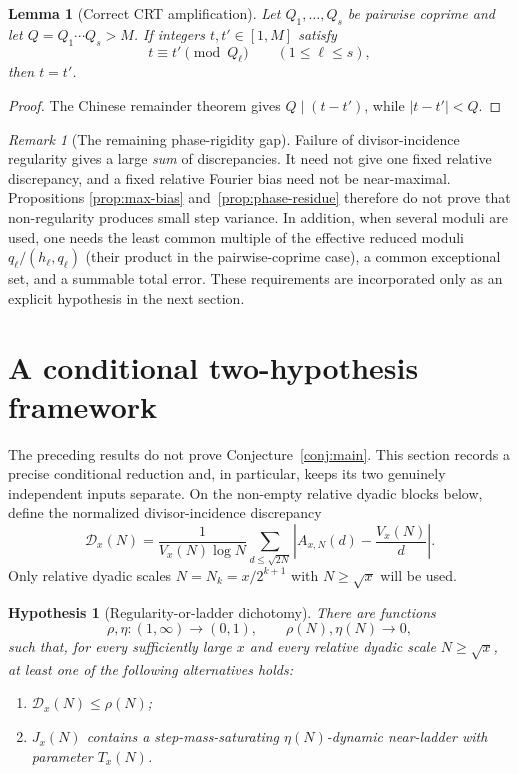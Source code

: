 \documentclass[11pt]{article}
\newtheorem{lemma}[theorem]{Lemma}
\newtheorem{hypothesis}[theorem]{Hypothesis}
\theoremstyle{definition}
\theoremstyle{remark}
\newtheorem{remark}[theorem]{Remark}
\begin{document}
\begin{lemma}[Correct CRT amplification]\label{lem:crt}
Let $Q_1,\ldots,Q_s$ be pairwise coprime and let
$Q=Q_1\cdots Q_s>M$.  If integers $t,t'\in[1,M]$ satisfy
\[
 t\equiv t'\pmod{Q_\ell}
 \qquad(1\leq\ell\leq s),
\]
then $t=t'$.
\end{lemma}

\begin{proof}
The Chinese remainder theorem gives $Q\mid(t-t')$, while
$|t-t'|<Q$.
\end{proof}

\begin{remark}[The remaining phase-rigidity gap]
Failure of divisor-incidence regularity gives a large \emph{sum} of
discrepancies.  It need not give one fixed relative discrepancy, and a
fixed relative Fourier bias need not be near-maximal.  Propositions
\ref{prop:max-bias} and~\ref{prop:phase-residue} therefore do not prove
that non-regularity produces small step variance.  In addition, when
several moduli are used, one needs the least common multiple of the
effective reduced moduli $q_\ell/(h_\ell,q_\ell)$ (their product in the
pairwise-coprime case), a common exceptional set, and a
summable total error.  These requirements are incorporated only as an
explicit hypothesis in the next section.
\end{remark}

\section{A conditional two-hypothesis framework}\label{sec:conditional}

The preceding results do not prove Conjecture~\ref{conj:main}.  This
section records a precise conditional reduction and, in particular,
keeps its two genuinely independent inputs separate.  On the non-empty
relative dyadic blocks below, define the
normalized divisor-incidence discrepancy
\[
 \mathcal D_x(N)=
 \frac{1}{V_x(N)\log N}
 \sum_{d\leq\sqrt{2N}}
 \left|A_{x,N}(d)-\frac{V_x(N)}d\right|.
\]
Only relative dyadic scales $N=N_k=x/2^{k+1}$ with
$N\geq\sqrt x$ will be used.

\begin{hypothesis}[Regularity-or-ladder dichotomy]\label{hyp:dichotomy}
There are functions
\[
 \rho,\eta:(1,\infty)\longrightarrow(0,1),
 \qquad \rho(N),\eta(N)\longrightarrow0,
\]
such that, for every sufficiently large $x$ and
every relative dyadic scale $N\geq\sqrt x$, at least one of the
following alternatives holds:
\begin{enumerate}[label=\textup{(\roman*)}]
 \item $\mathcal D_x(N)\leq\rho(N)$;
 \item $J_x(N)$ contains a step-mass-saturating
 $\eta(N)$-dynamic near-ladder with parameter $T_x(N)$.
\end{enumerate}
\end{hypothesis}
\end{document}
